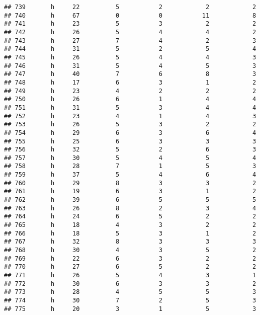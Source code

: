 \documentclass[
]{article}
\begin{document}
\begin{verbatim}
## 739       h     22          5           2            2            2
## 740       h     67          0           0           11            8
## 741       h     23          5           3            2            2
## 742       h     26          5           4            4            2
## 743       h     27          7           4            2            3
## 744       h     31          5           2            5            4
## 745       h     26          5           4            4            3
## 746       h     31          5           4            5            3
## 747       h     40          7           6            8            3
## 748       h     17          6           3            1            2
## 749       h     23          4           2            2            2
## 750       h     26          6           1            4            4
## 751       h     31          5           3            4            4
## 752       h     23          4           1            4            3
## 753       h     26          5           3            2            2
## 754       h     29          6           3            6            4
## 755       h     25          6           3            3            3
## 756       h     32          5           2            6            3
## 757       h     30          5           4            5            4
## 758       h     28          7           1            5            3
## 759       h     37          5           4            6            4
## 760       h     29          8           3            3            2
## 761       h     19          6           3            1            2
## 762       h     39          6           5            5            5
## 763       h     26          8           2            3            4
## 764       h     24          6           5            2            2
## 765       h     18          4           3            2            2
## 766       h     18          5           3            1            2
## 767       h     32          8           3            3            3
## 768       h     30          4           3            5            2
## 769       h     22          6           3            2            2
## 770       h     27          6           5            2            2
## 771       h     26          5           4            3            1
## 772       h     30          6           3            3            2
## 773       h     28          4           5            5            3
## 774       h     30          7           2            5            3
## 775       h     20          3           1            5            3

\end{verbatim}
\end{document}
